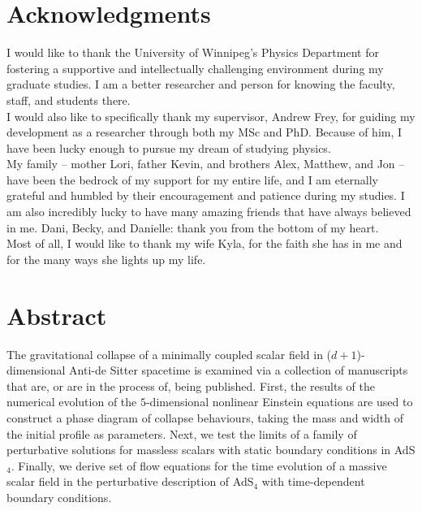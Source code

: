 \documentclass[12pt, a4paper]{report} %
\numberwithin{equation}{chapter}
\begin{document}
\section*{Acknowledgments}
I would like to thank the University of Winnipeg's Physics Department for fostering a supportive and intellectually challenging environment during my graduate studies. I am a better researcher and person for knowing the faculty, staff, and students there. \\
I would also like to specifically thank my supervisor, Andrew Frey, for guiding my development as a researcher through both my MSc and PhD. Because of him, I have been lucky enough to pursue my dream of studying physics. \\
My family -- mother Lori, father Kevin, and brothers Alex, Matthew, and Jon -- have been the bedrock of my support for my entire life, and I am eternally grateful and humbled by their encouragement and patience during my studies. I am also incredibly lucky to have many amazing friends that have always believed in me. Dani, Becky, and Danielle: thank you from the bottom of my heart. \\
Most of all, I would like to thank my wife Kyla, for the faith she has in me and for the many ways she lights up my life.

\vspace*{\fill}
\clearpage

\newpage

\vspace*{\fill}
\section*{Abstract}

The gravitational collapse of a minimally coupled scalar field in ($d + 1$)-dimensional Anti-de Sitter spacetime is examined via a collection of manuscripts that are, or are in the process of, being published. First, the results of the numerical evolution of the $5$-dimensional nonlinear Einstein equations are used to construct a phase diagram of collapse behaviours, taking the mass and width of the initial profile as parameters. Next, we test the limits of a family of perturbative solutions for massless scalars with static boundary conditions in AdS$_4$. Finally, we derive set of flow equations for the time evolution of a massive scalar field in the perturbative description of AdS$_4$ with time-dependent boundary conditions. 
\end{document}
